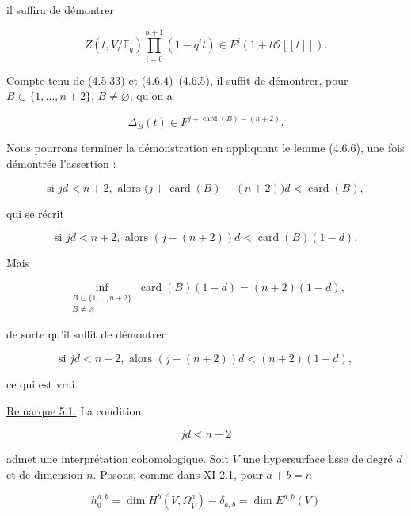 il suffira de démontrer

\begin{equation}\tag{5.0.11}
Z(t,V/\mathbb F_q)\prod_{i=0}^{n+1}(1-q^it)
\in F^j(1+t\mathcal O[[t]]).
\end{equation}

Compte tenu de (4.5.33) et (4.6.4)--(4.6.5), il suffit de démontrer, pour
$B\subset\{1,\ldots,n+2\}$, $B\ne\varnothing$, qu'on a

\begin{equation}\tag{5.0.12}
\Delta_B(t)\in F^{j+\operatorname{card}(B)-(n+2)}.
\end{equation}

Nous pourrons terminer la démonstration en appliquant le lemme (4.6.6), une
fois démontrée l'assertion :

\begin{equation}\tag{5.0.13}
\text{si }jd<n+2,\text{ alors }
\bigl(j+\operatorname{card}(B)-(n+2)\bigr)d
<\operatorname{card}(B),
\end{equation}

qui se récrit


\begin{equation}\tag{5.0.14}
\text{si }jd<n+2,\text{ alors }
(j-(n+2))d<\operatorname{card}(B)(1-d).
\end{equation}

Mais

\[
\inf_{\substack{B\subset\{1,\ldots,n+2\}\\B\ne\varnothing}}
\operatorname{card}(B)(1-d)
=(n+2)(1-d),
\]

de sorte qu'il suffit de démontrer

\begin{equation}\tag{5.0.15}
\text{si }jd<n+2,\text{ alors }
(j-(n+2))d<(n+2)(1-d),
\end{equation}

ce qui est vrai.

\underline{Remarque 5.1.}
La condition

\begin{equation}\tag{5.1.1}
jd<n+2
\end{equation}

admet une interprétation cohomologique. Soit $V$ une hypersurface \underline{lisse} de
degré $d$ et de dimension $n$. Posons, comme dans XI 2.1, pour $a+b=n$

\begin{equation}\tag{5.1.2}
h_0^{a,b}
=\dim H^b(V,\underline{\Omega}_V^a)-\delta_{a,b}
=\dim E^{a,b}(V)
\end{equation}

